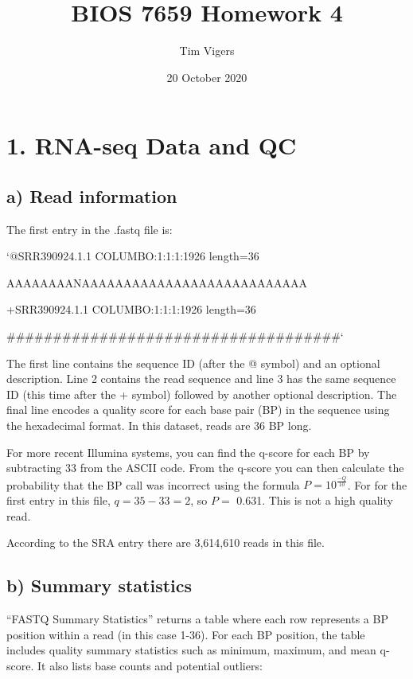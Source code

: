\documentclass[
]{article}
\title{BIOS 7659 Homework 4}
\author{Tim Vigers}
\date{20 October 2020}
\begin{document}
\maketitle

\hypertarget{rna-seq-data-and-qc}{%
\section{1. RNA-seq Data and QC}\label{rna-seq-data-and-qc}}

\hypertarget{a-read-information}{%
\subsection{a) Read information}\label{a-read-information}}

The first entry in the .fastq file is:

`@SRR390924.1.1 COLUMBO:1:1:1:1926 length=36

AAAAAAAANAAAAAAAAAAAAAAAAAAAAAAAAAAA

+SRR390924.1.1 COLUMBO:1:1:1:1926 length=36

\#\#\#\#\#\#\#\#\#\#\#\#\#\#\#\#\#\#\#\#\#\#\#\#\#\#\#\#\#\#\#\#\#\#\#\#`

The first line contains the sequence ID (after the @ symbol) and an
optional description. Line 2 contains the read sequence and line 3 has
the same sequence ID (this time after the + symbol) followed by another
optional description. The final line encodes a quality score for each
base pair (BP) in the sequence using the hexadecimal format. In this
dataset, reads are 36 BP long.

For more recent Illumina systems, you can find the q-score for each BP
by subtracting 33 from the ASCII code. From the q-score you can then
calculate the probability that the BP call was incorrect using the
formula \(P=10^{\frac{-Q}{10}}\). For for the first entry in this file,
\(q=35-33=2\), so \(P=\) 0.631. This is not a high quality read.

According to the SRA entry there are 3,614,610 reads in this file.

\hypertarget{b-summary-statistics}{%
\subsection{b) Summary statistics}\label{b-summary-statistics}}

``FASTQ Summary Statistics'' returns a table where each row represents a
BP position within a read (in this case 1-36). For each BP position, the
table includes quality summary statistics such as minimum, maximum, and
mean q-score. It also lists base counts and potential outliers:
\end{document}
